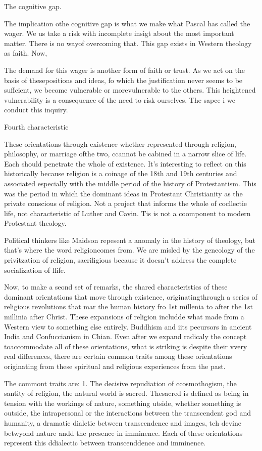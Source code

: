 \documentclass[12pt,letterpaper]{article}
\begin{document}
The cognitive gap.

The implication othe cognitive gap is what we make what Pascal has called the wager.  We us take a risk with incomplete insigt about the most important matter.  There is no wayof overcoming that.  This gap exists in Western theology as faith.  Now,

The demand for this wager is another form of faith or trust.  As we act on the basis of thesepositions and ideas, fo which the justification never seems to be suffcient, we become vulnerable or morevulnerable to the others.  This heightened vulnerability is a consequence of the need to risk ourselves.  The sapce i we conduct this inquiry.

Fourth characteristic 

These orientations through existence whether represented through religion, philosophy, or marriage ofthe two, ccannot be cabined in a narrow slice of life.  Each should penetrate the whole of existence.  It's interesting to reflect on this historically because religion is a coinage of the 18th and 19th centuries and associated especially with the middle period of the history of Protestantism.  This was the period in which the dominant ideas in Protestant Christianity as the private conscious of religion.  Not a project that informs the whole of cocllectie life, not  characteristic of Luther and Cavin.  Tis is not a coomponent to modern Protestant theology.

Political thinkers like Maidson repesent a anomaly in the history of theology, but that's where the word religioncomes from.  We are misled by the geneology of the privitzation of religion, sacriligious because it doesn't address the complete socialization of llife.

Now, to  make a seond set of remarks, the shared characteristics of these dominant orientations that move through existence, originatingthrough a series of religious revolutions that mar the human history fro 1st millenia to after the 1st millinia after Christ.  These expansions of religion includde what made from a Western view to something else entirely.  Buddhism and iits pecursors in ancient India and Confuccianism in Chian.  Even after we expand radicaly the concept toaccommodate all of these orientations, what is striking is despite their vvery real differences, there are certain common traits among these orientations originating from these spiritual and religious experiences from the past.

The commont traits are:
1. The decisive repudiation of ccosmothogism, the santity of religion, the natural world is sacred.
Thesacred is defined as being in tension with the workings of nature, something utside, whether something is outside, the intrapersonal or the interactions between the transcendent god and humanity, a dramatic dialetic between transcendence and images, teh devine betwyond nature andd the presence in imminence.  Each of these orientations represent this ddialectic between transcenddence and imminence.
\end{document}
